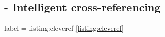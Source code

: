 
\subsection{ - Intelligent cross-referencing}

\begin{tcblisting}{label = listing:cleveref}
  \cref{listing:cleveref}
\end{tcblisting}

